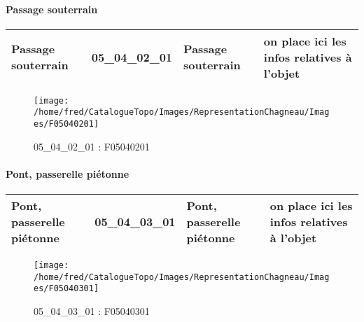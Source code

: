 \documentclass[12pt,titlepage,oneside]{book}
\begin{document}
\paragraph{Passage souterrain}
\noindent
\vspace{\baselineskip}

\renewcommand{\arraystretch}{1.2}
\begin{supertabular}{|p{10cm}|c|p{13cm}|p{12cm}|}
 Passage souterrain & 05\_04\_02\_01 & Passage souterrain & on place ici les infos relatives à l'objet\\
\hline
\end{supertabular}
\begin{figure}[h!]
  \hfill         %
  \begin{minipage}[t]{3cm}
    \begin{center}
      \texttt{[image: /home/fred/CatalogueTopo/Images/RepresentationChagneau/Images/F05040201]}
      \caption[F05040201]{\label{} 05\_04\_02\_01 : F05040201}
    \end{center}
  \end{minipage}
\end{figure}


\paragraph{Pont, passerelle piétonne}
\noindent
\vspace{\baselineskip}

\renewcommand{\arraystretch}{1.2}
\begin{supertabular}{|p{10cm}|c|p{13cm}|p{12cm}|}
 Pont, passerelle piétonne & 05\_04\_03\_01 & Pont, passerelle piétonne & on place ici les infos relatives à l'objet\\
\hline
\end{supertabular}
\begin{figure}[h!]
  \hfill         %
  \begin{minipage}[t]{3cm}
    \begin{center}
      \texttt{[image: /home/fred/CatalogueTopo/Images/RepresentationChagneau/Images/F05040301]}
      \caption[F05040301]{\label{} 05\_04\_03\_01 : F05040301}
    \end{center}
  \end{minipage}
\end{figure}
\end{document}
